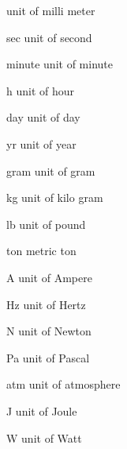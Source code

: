 \begin{datadesc}{mm}
  unit of milli meter
\end{datadesc}

\begin{datadesc}{sec}
 unit of second
\end{datadesc}

\begin{datadesc}{minute}
  unit of minute
\end{datadesc}

\begin{datadesc}{h}
unit of hour
\end{datadesc}
\begin{datadesc}{day}
unit of day
\end{datadesc}
\begin{datadesc}{yr}
 unit of year
\end{datadesc}

\begin{datadesc}{gram}
unit of gram
\end{datadesc}
\begin{datadesc}{kg}
unit of kilo gram
 \end{datadesc}
\begin{datadesc}{lb}
unit of pound
\end{datadesc}
\begin{datadesc}{ton}
 metric ton
\end{datadesc}

\begin{datadesc}{A}
 unit of Ampere
\end{datadesc}

\begin{datadesc}{Hz}
 unit of Hertz
\end{datadesc}

\begin{datadesc}{N}
 unit of Newton
\end{datadesc}
\begin{datadesc}{Pa}
unit of Pascal
\end{datadesc}
\begin{datadesc}{atm}
unit of atmosphere
\end{datadesc}
\begin{datadesc}{J}
unit of Joule
\end{datadesc}

\begin{datadesc}{W}
unit of Watt
\end{datadesc}

